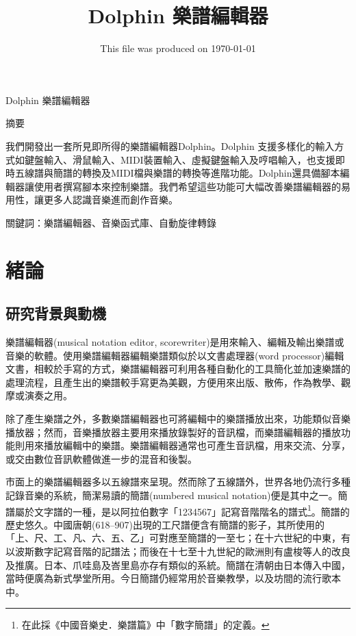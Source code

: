 \documentclass[12pt,a4paper,oneside]{report}
\begin{document}
\title{Dolphin 樂譜編輯器}
\date{This file was produced on \today}
\maketitle

\begin{center}
Dolphin 樂譜編輯器

摘要
\end{center}

我們開發出一套所見即所得的樂譜編輯器Dolphin。Dolphin 支援多樣化的輸入方式如鍵盤輸入、滑鼠輸入、MIDI裝置輸入、虛擬鍵盤輸入及哼唱輸入，也支援即時五線譜與簡譜的轉換及MIDI檔與樂譜的轉換等進階功能。Dolphin還具備腳本編輯器讓使用者撰寫腳本來控制樂譜。我們希望這些功能可大幅改善樂譜編輯器的易用性，讓更多人認識音樂進而創作音樂。

關鍵詞：樂譜編輯器、音樂函式庫、自動旋律轉錄


\tableofcontents

\chapter{緒論}
\section{研究背景與動機}


樂譜編輯器(musical notation editor, scorewriter)是用來輸入、編輯及輸出樂譜或音樂的軟體。使用樂譜編輯器編輯樂譜類似於以文書處理器(word processor)編輯文書，相較於手寫的方式，樂譜編輯器可利用各種自動化的工具簡化並加速樂譜的處理流程，且產生出的樂譜較手寫更為美觀，方便用來出版、散佈，作為教學、觀摩或演奏之用。

除了產生樂譜之外，多數樂譜編輯器也可將編輯中的樂譜播放出來，功能類似音樂播放器；然而，音樂播放器主要用來播放錄製好的音訊檔，而樂譜編輯器的播放功能則用來播放編輯中的樂譜。樂譜編輯器通常也可產生音訊檔，用來交流、分享，或交由數位音訊軟體做進一步的混音和後製。

市面上的樂譜編輯器多以五線譜來呈現。然而除了五線譜外，世界各地仍流行多種記錄音樂的系統，簡潔易讀的簡譜(numbered musical notation)便是其中之一。簡譜屬於文字譜的一種\cite{chinaEncyclopedia}，是以阿拉伯數字「1234567」記寫音階階名的譜式\footnote{在此採《中國音樂史．樂譜篇》中「數字簡譜」\cite{chinaMusicHistory}的定義。}。簡譜的歷史悠久。中國唐朝(618–907)出現的工尺譜便含有簡譜的影子，其所使用的「上、尺、工、凡、六、五、乙」可對應至簡譜的一至七\cite{wiki}；在十六世紀的中東，有以波斯數字記寫音階的記譜法；而後在十七至十九世紀的歐洲則有盧梭等人的改良及推廣。日本、爪哇島及峇里島亦存有類似的系統\cite{britannica}。簡譜在清朝由日本傳入中國，當時便廣為新式學堂所用。今日簡譜仍經常用於音樂教學，以及坊間的流行歌本中。
\end{document}
